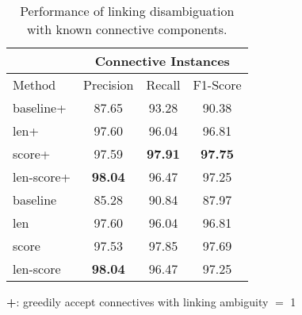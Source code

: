 \begin{table}[ht]
\centering
\begin{tabular}{|l|c|c|c|}
\hline
                            & \multicolumn{3}{c|}{Connective Instances}  \\ \hline
    Method                  &     Precision &     Recall &     F1-Score  \\ \hline
    baseline+               &     87.65     &     93.28  &     90.38     \\ \hline
    len+                    &     97.60     &     96.04  &     96.81     \\ \hline
    score+                  &     97.59     & \bf 97.91  & \bf 97.75     \\ \hline
    len-score+              & \bf 98.04     &     96.47  &     97.25     \\


\hhline{|=|=|=|=|}

    baseline                &     85.28     &     90.84  &     87.97     \\ \hline
    len                     &     97.60     &     96.04  &     96.81     \\ \hline
    score                   &     97.53     &     97.85  &     97.69     \\ \hline
    len-score               & \bf 98.04     &     96.47  &     97.25     \\ \hline

\end{tabular}
\begin{flushleft}
\small
\textbf{+}: greedily accept connectives with linking ambiguity $=$ 1
\end{flushleft}
\caption{\label{t:linking-perfect-methods} Performance of linking
disambiguation with known connective components. }
\end{table}

